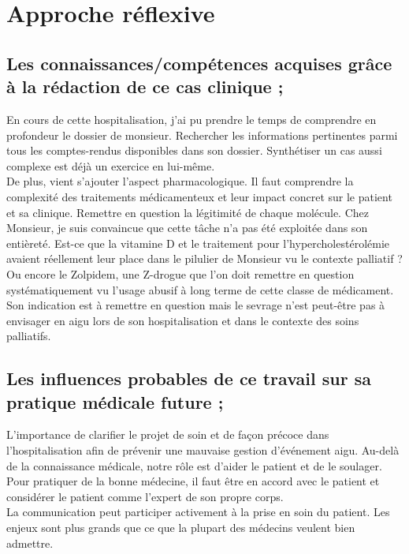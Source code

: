 \section{Approche réflexive}

\subsection{Les connaissances/compétences acquises grâce à la rédaction de ce cas clinique ;} 

En cours de cette hospitalisation, j’ai pu prendre le temps de comprendre en profondeur le dossier de monsieur. Rechercher les informations pertinentes parmi tous les comptes-rendus disponibles dans son dossier. Synthétiser un cas aussi complexe est déjà un exercice en lui-même.\\
De plus, vient s’ajouter l’aspect pharmacologique. Il faut comprendre la complexité des traitements médicamenteux et leur impact concret sur le patient et sa clinique. Remettre en question la légitimité de chaque molécule. Chez Monsieur, je suis convaincue que cette tâche n’a pas été exploitée dans son entièreté. Est-ce que la vitamine D et le traitement pour l’hypercholestérolémie avaient réellement leur place dans le pilulier de Monsieur vu le contexte palliatif ? Ou encore le Zolpidem, une Z-drogue que l’on doit remettre en question systématiquement vu l’usage abusif à long terme de cette classe de médicament. Son indication est à remettre en question  mais le sevrage n’est peut-être pas à envisager en aigu lors de son hospitalisation et dans le contexte des soins palliatifs.

\subsection{Les influences probables de ce travail sur sa pratique médicale future ;}

L’importance de clarifier le projet de soin et de façon précoce dans l’hospitalisation afin de prévenir une mauvaise gestion d’événement aigu. Au-delà de la connaissance médicale, notre rôle est d’aider le patient et de le soulager. Pour pratiquer de la bonne médecine, il faut être en accord avec le patient et considérer le patient comme l’expert de son propre corps.\\ 

La communication peut participer activement à la prise en soin du patient. Les enjeux sont plus grands que ce que la plupart des médecins veulent bien admettre.

